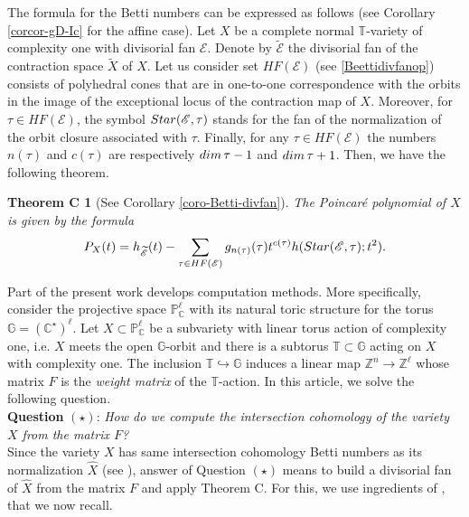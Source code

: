 \documentclass[11pt, reqno]{amsart}
\theoremstyle{plain}
\newtheorem*{thmC}{Theorem C}
\theoremstyle{definition}
\theoremstyle{remark}
\begin{document}
The formula for the Betti numbers can be expressed as follows (see Corollary \ref{corcor-gD-Ic} for the affine case). 
 Let $X$ be a complete normal $\mathbb{T}$-variety of complexity one
with divisorial fan $\mathscr{E}$. 
Denote by $\widetilde{\mathscr{E}}$ the divisorial fan of the contraction space $\widetilde{X}$ of $X$. Let us consider set $HF(\mathscr{E})$ (see \ref{Beettidivfanop})  consists of polyhedral cones that are in one-to-one
correspondence with the orbits in the image of the exceptional locus of the contraction map of $X$. Moreover, for $\tau\in HF(\mathscr{E})$, the symbol ${\rm Star}(\mathscr{E}, \tau)$ stands for the fan of the normalization of the orbit closure associated with $\tau$. Finally, for any $\tau\in HF(\mathscr{E})$ the numbers $n(\tau)$ and $c(\tau)$ are respectively ${\rm dim}\, \tau -1$ and ${\rm dim}\, \tau +1$. Then, we have the following theorem.

\begin{thmC}[See Corollary \ref{coro-Betti-divfan}]
The 
Poincar\'e polynomial of $X$ is given by the formula
$$P_{X}(t)  =  h_{\widetilde{\mathscr{E}}}(t) -  \sum_{\tau\in HF(\mathscr{E})}g_{n(\tau)}(\tau)t^{c(\tau)}h({\rm Star}(\mathscr{E}, \tau); t^{2}).$$

\end{thmC}
Part of the present work develops computation methods. More specifically, consider the projective space $\mathbb{P}^{\ell}_{\mathbb{C}}$ with its natural toric structure for the torus $\mathbb{G} =  (\mathbb{C}^{\star})^{\ell}$. Let $X\subset \mathbb{P}^{\ell}_{\mathbb{C}}$ be a subvariety with linear torus action of complexity one, i.e. $X$ meets
 the open $\mathbb{G}$-orbit and there is a subtorus $\mathbb{T}\subset\mathbb{G}$ acting on $X$ with complexity one.
 The inclusion $\mathbb{T}\hookrightarrow \mathbb{G}$ induces a linear map $\mathbb{Z}^{n}\rightarrow \mathbb{Z}^{\ell}$ whose matrix $F$ is the \emph{weight matrix} of the $\mathbb{T}$-action. In this article,
we solve the following question.
\\

{\bf Question}
$(\star)$: \emph{How do we compute the intersection cohomology of the variety $X$ from the matrix $F$?}
\\

Since the variety $X$ has same intersection cohomology Betti numbers as its normalization $\widehat{X}$ (see \cite[Section 5, Lemma 1]{GS93}), answer of Question  $(\star)$ means to build a divisorial fan of $\widehat{X}$ from the matrix $F$ and apply Theorem C. 
For this, we use ingredients of \cite{KSZ91}, \cite[Section 4]{AIPSV12} that we now recall.
\end{document}
